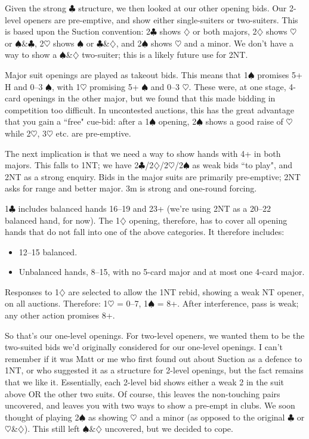 \documentclass[a4paper,14pt]{extarticle}
\begin{document}
Given the strong $\clubsuit$ structure, we then looked at our other opening
bids.  Our 2-level openers are pre-emptive, and show either single-suiters or
two-suiters.  This is based upon the Suction convention: 2$\clubsuit$ shows
$\diamondsuit$ or both majors, 2$\diamondsuit$ shows $\heartsuit$ or
$\spadesuit$\&$\clubsuit$, 2$\heartsuit$ shows $\spadesuit$ or
$\clubsuit$\&$\diamondsuit$, and 2$\spadesuit$ shows $\heartsuit$ and a minor.
We don't have a way to show a $\spadesuit$\&$\diamondsuit$ two-suiter; this is
a likely future use for 2NT.

Major suit openings are played as takeout bids.  This means that 1$\spadesuit$
promises 5+ H and 0--3 $\spadesuit$, with 1$\heartsuit$ promising 5+
$\spadesuit$ and 0--3 $\heartsuit$.  These were, at one stage, 4-card openings
in the other major, but we found that this made bidding in competition too
difficult.  In uncontested auctions, this has the great advantage that you gain
a ``free" cue-bid: after a 1$\spadesuit$ opening, 2$\spadesuit$ shows a good
raise of $\heartsuit$ while 2$\heartsuit$, 3$\heartsuit$ etc. are pre-emptive.

The next implication is that we need a way to show hands with 4+ in both
majors.  This falls to 1NT; we have
2$\clubsuit$/2$\diamondsuit$/2$\heartsuit$/2$\spadesuit$ as weak bids ``to
play", and 2NT as a strong enquiry.  Bids in the major suits are primarily
pre-emptive; 2NT asks for range and better major.  3m is strong and one-round
forcing.

1$\clubsuit$ includes balanced hands 16--19 and 23+ (we're using 2NT as a
20--22 balanced hand, for now).  The 1$\diamondsuit$ opening, therefore, has to
cover all opening hands that do not fall into one of the above categories.  It
therefore includes:

\begin{itemize}
\item 12--15 balanced.
\item Unbalanced hands, 8--15, with no 5-card major and at most one 4-card
      major.
\end{itemize}

Responses to 1$\diamondsuit$ are selected to allow the 1NT rebid, showing a
weak NT opener, on all auctions.  Therefore: 1$\heartsuit$ = 0--7,
1$\spadesuit$ = 8+.  After interference, pass is weak; any other action
promises 8+.

So that's our one-level openings.  For two-level openers, we wanted them to be
the two-suited bids we'd originally considered for our one-level openings.  I
can't remember if it was Matt or me who first found out about Suction as a
defence to 1NT, or who suggested it as a structure for 2-level openings, but
the fact remains that we like it.  Essentially, each 2-level bid shows either a
weak 2 in the suit above OR the other two suits.  Of course, this leaves the
non-touching pairs uncovered, and leaves you with two ways to show a pre-empt
in clubs.  We soon thought of playing 2$\spadesuit$ as showing $\heartsuit$ and
a minor (as opposed to the original $\clubsuit$ or
		$\heartsuit$\&$\diamondsuit$).  This still left
$\spadesuit$\&$\diamondsuit$ uncovered, but we decided to cope.
\end{document}
